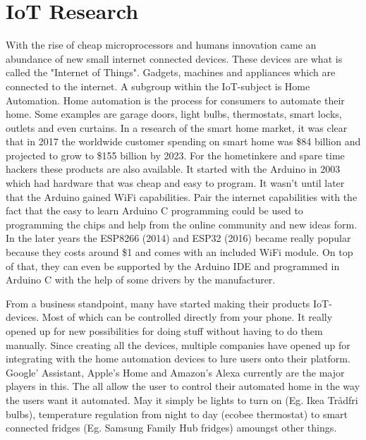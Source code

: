 \section{IoT Research}

With the rise of cheap microprocessors and humans innovation came an abundance of new small internet connected devices. These devices are what is called the "Internet of Things". Gadgets, machines and appliances which are connected to the internet\cite{iot-definition}. A subgroup within the IoT-subject is Home Automation. Home automation is the process for consumers to automate their home. Some examples are garage doors, light bulbs, thermostats, smart locks, outlets and even curtains. In a research of the smart home market, it was clear that in 2017 the worldwide customer spending on smart home was \$84 billion and projected to grow to \$155 billion by 2023\cite{home-auto-growth}. For the hometinkere and spare time hackers these products are also available. It started with the Arduino in 2003 which had hardware that was cheap and easy to program\cite{arduino-history}. It wasn't until later that the Arduino gained WiFi capabilities. Pair the internet capabilities with the fact that the easy to learn Arduino C programming could be used to programming the chips and help from the online community and new ideas form. 
In the later years the ESP8266 (2014) and ESP32 (2016) became really popular because they costs around \$1 and comes with an included WiFi module. On top of that, they can even be supported by the Arduino IDE and programmed in Arduino C with the help of some drivers by the manufacturer.

From a business standpoint, many have started making their products IoT-devices. Most of which can be controlled directly from your phone.  It really opened up for new possibilities for doing stuff without having to do them manually. Since creating all the devices, multiple companies have opened up for integrating with the home automation devices to lure users onto their platform. Google' Assistant\cite{google-assistant}, Apple's Home\cite{apple-homekit} and Amazon's Alexa\cite{amazon-alexa} currently are the major players in this. The all allow the user to control their automated home in the way the users want it automated. May it simply be lights to turn on (Eg. Ikea Trådfri bulbs), temperature regulation from night to day (ecobee thermostat) to smart connected fridges (Eg. Samsung Family Hub fridges) amoungst other things. 